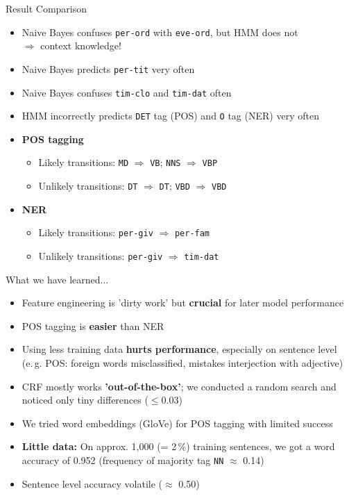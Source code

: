 \begin{frame}{Result Comparison}{}
	\begin{itemize}
		\item Naive Bayes confuses \texttt{per-ord} with \texttt{eve-ord}, but HMM does not \\
			$\Rightarrow$ context knowledge!
		\item Naive Bayes predicts \texttt{per-tit} very often
		\item Naive Bayes confuses \texttt{tim-clo} and \texttt{tim-dat} often
		\item HMM incorrectly predicts \texttt{DET} tag (POS) and \texttt{O} tag (NER) very often
		\item \textbf{POS tagging}
		\begin{itemize}
			\item Likely transitions: \texttt{MD} $\Rightarrow$ \texttt{VB}; \texttt{NNS} $\Rightarrow$ \texttt{VBP}
			\item Unlikely transitions: \texttt{DT} $\Rightarrow$ \texttt{DT}; \texttt{VBD} $\Rightarrow$ \texttt{VBD}
		\end{itemize}
		\item \textbf{NER}
		\begin{itemize}
			\item Likely transitions: \texttt{per-giv} $\Rightarrow$ \texttt{per-fam}
			\item Unlikely transitions: \texttt{per-giv} $\Rightarrow$ \texttt{tim-dat}
		\end{itemize}
	\end{itemize}
\end{frame}


\begin{frame}{What we have learned...}{}
	\begin{itemize}
		\item Feature engineering is 'dirty work' but \textbf{crucial} for later model performance 
		\item POS tagging is \textbf{easier} than NER
		\item Using less training data \textbf{hurts performance}, especially on sentence level \\
			(e.\,g. POS: foreign words misclassified, mistakes interjection with adjective)
		\item CRF mostly works \textbf{'out-of-the-box'}; we conducted a random search and noticed only tiny differences 
			($\le 0.03$)
		\item We tried word embeddings (GloVe) for POS tagging with limited success
		\item \textbf{Little data:} On approx. 1,000 (= 2\,\%) training sentences, we got a word accuracy of 0.952
			(frequency of majority tag \texttt{NN} $\approx$ 0.14)
		\item Sentence level accuracy volatile ($\approx$ 0.50)
	\end{itemize}
\end{frame}


\makethanks

